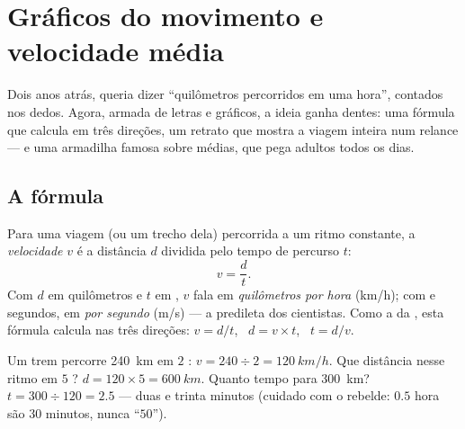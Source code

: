 \chapter{Gráficos do movimento e velocidade média}\label{ch:g7:motion-average-speed}

Dois anos atrás,  queria dizer ``quilômetros percorridos em
uma hora'', contados nos dedos. Agora, armada de letras e gráficos, a
ideia ganha dentes: uma fórmula que calcula em três direções, um
retrato que mostra a viagem inteira num relance --- e uma armadilha
famosa sobre médias, que pega adultos todos os dias.

\section{A fórmula}

\begin{definition}\label{def:g7:motion-average-speed:formula}
Para uma viagem (ou um trecho dela) percorrida a um ritmo constante,
a \emph{velocidade} $v$ é a distância $d$ dividida
pelo tempo de percurso $t$:
\[
v = \frac{d}{t}.
\]
Com $d$ em quilômetros e $t$ em , $v$ fala em
\emph{quilômetros por hora} (\unit{km/h}); com  e segundos, em
\emph{ por segundo} (\unit{m/s}) --- a predileta dos
cientistas. Como a da , esta fórmula calcula nas três
direções: $v = d/t$, \ $d = v \times t$, \ $t = d/v$.
\end{definition}

\begin{example}\label{ex:g7:motion-average-speed:recipes}
Um trem percorre \qty{240}{km} em $2$ :
$v = 240 \div 2 = \qty{120}{km/h}$. Que distância nesse ritmo em $5$
? $d = 120 \times 5 = \qty{600}{km}$. Quanto tempo para
\qty{300}{km}? $t = 300 \div 120 = 2.5$  --- duas  e trinta
minutos (cuidado com o rebelde: $0.5$ hora são $30$ minutos, nunca
``$50$'').
\end{example}

